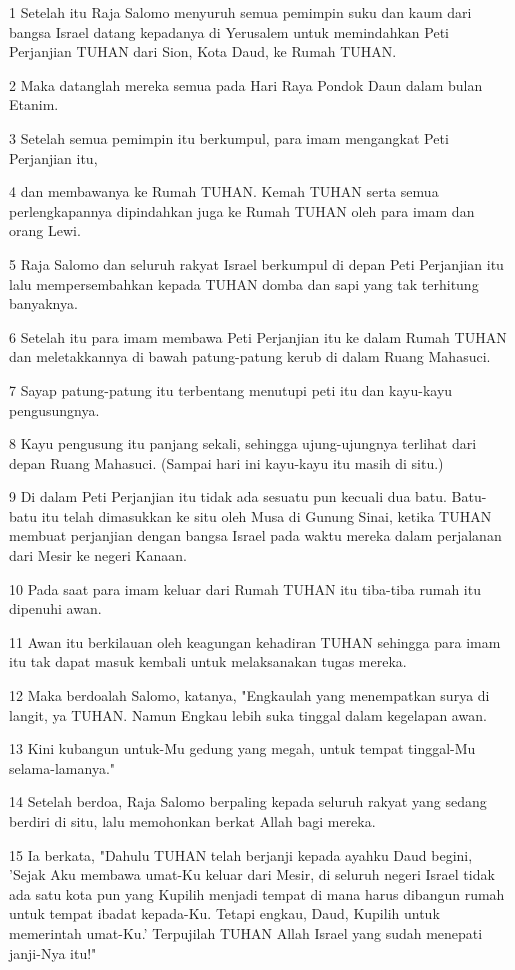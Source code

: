 \par 1 Setelah itu Raja Salomo menyuruh semua pemimpin suku dan kaum dari bangsa Israel datang kepadanya di Yerusalem untuk memindahkan Peti Perjanjian TUHAN dari Sion, Kota Daud, ke Rumah TUHAN.
\par 2 Maka datanglah mereka semua pada Hari Raya Pondok Daun dalam bulan Etanim.
\par 3 Setelah semua pemimpin itu berkumpul, para imam mengangkat Peti Perjanjian itu,
\par 4 dan membawanya ke Rumah TUHAN. Kemah TUHAN serta semua perlengkapannya dipindahkan juga ke Rumah TUHAN oleh para imam dan orang Lewi.
\par 5 Raja Salomo dan seluruh rakyat Israel berkumpul di depan Peti Perjanjian itu lalu mempersembahkan kepada TUHAN domba dan sapi yang tak terhitung banyaknya.
\par 6 Setelah itu para imam membawa Peti Perjanjian itu ke dalam Rumah TUHAN dan meletakkannya di bawah patung-patung kerub di dalam Ruang Mahasuci.
\par 7 Sayap patung-patung itu terbentang menutupi peti itu dan kayu-kayu pengusungnya.
\par 8 Kayu pengusung itu panjang sekali, sehingga ujung-ujungnya terlihat dari depan Ruang Mahasuci. (Sampai hari ini kayu-kayu itu masih di situ.)
\par 9 Di dalam Peti Perjanjian itu tidak ada sesuatu pun kecuali dua batu. Batu-batu itu telah dimasukkan ke situ oleh Musa di Gunung Sinai, ketika TUHAN membuat perjanjian dengan bangsa Israel pada waktu mereka dalam perjalanan dari Mesir ke negeri Kanaan.
\par 10 Pada saat para imam keluar dari Rumah TUHAN itu tiba-tiba rumah itu dipenuhi awan.
\par 11 Awan itu berkilauan oleh keagungan kehadiran TUHAN sehingga para imam itu tak dapat masuk kembali untuk melaksanakan tugas mereka.
\par 12 Maka berdoalah Salomo, katanya, "Engkaulah yang menempatkan surya di langit, ya TUHAN. Namun Engkau lebih suka tinggal dalam kegelapan awan.
\par 13 Kini kubangun untuk-Mu gedung yang megah, untuk tempat tinggal-Mu selama-lamanya."
\par 14 Setelah berdoa, Raja Salomo berpaling kepada seluruh rakyat yang sedang berdiri di situ, lalu memohonkan berkat Allah bagi mereka.
\par 15 Ia berkata, "Dahulu TUHAN telah berjanji kepada ayahku Daud begini, 'Sejak Aku membawa umat-Ku keluar dari Mesir, di seluruh negeri Israel tidak ada satu kota pun yang Kupilih menjadi tempat di mana harus dibangun rumah untuk tempat ibadat kepada-Ku. Tetapi engkau, Daud, Kupilih untuk memerintah umat-Ku.' Terpujilah TUHAN Allah Israel yang sudah menepati janji-Nya itu!"
